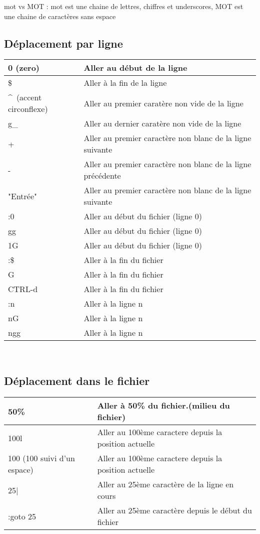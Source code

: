 \documentclass{article}
\begin{document}
mot vs MOT : mot est une chaine de lettres, chiffres et underscores, MOT est une chaine de caractères sans espace\\

\subsection{Déplacement par ligne}
\begin{tabular}{|p{3cm}| l| }
\hline
0 (zero) & Aller au début de la ligne \\ \hline
\$ & Aller à la fin de la ligne \\ \hline
\^~(accent circonflexe) & Aller au premier caratère non vide de la ligne \\ \hline
g\_ & Aller au dernier caratère non vide de la ligne \\ \hline
+ & Aller au premier caractère non blanc de la ligne suivante \\ \hline
- & Aller au premier caractère non blanc de la ligne précédente \\ \hline
"Entrée" & Aller au premier caractère non blanc de la ligne suivante\\ \hline
:0 & Aller au début du fichier (ligne 0) \\ \hline
gg & Aller au début du fichier (ligne 0) \\ \hline
1G & Aller au début du fichier (ligne 0) \\ \hline
:\$ & Aller à la fin du fichier\\ \hline
G & Aller à la fin du fichier\\ \hline
CTRL-d & Aller à la fin du fichier\\ \hline
:n & Aller à la ligne n\\ \hline
nG & Aller à la ligne n\\ \hline
ngg & Aller à la ligne n\\ \hline
\end{tabular}\\[0.5cm]


\subsection{Déplacement dans le fichier}
\begin{tabular}{|p{3cm}| l| }
\hline
  50\% & Aller à 50\% du fichier.(milieu du fichier) \\ \hline
  100l & Aller au 100ème caractere depuis la position actuelle \\ \hline
  100 (100 suivi d'un espace) & Aller au 100ème caractere depuis la position actuelle \\ \hline
  25| & Aller au 25ème caractère de la ligne en cours\\ \hline
  :goto 25 & Aller au 25ème caractère depuis le début du fichier\\ \hline
\end{tabular}\\
\end{document}
